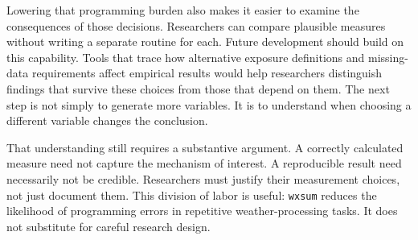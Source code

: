 Lowering that programming burden also makes it easier to examine the consequences of those decisions. Researchers can compare plausible measures without writing a separate routine for each. Future development should build on this capability. Tools that trace how alternative exposure definitions and missing-data requirements affect empirical results would help researchers distinguish findings that survive these choices from those that depend on them. The next step is not simply to generate more variables. It is to understand when choosing a different variable changes the conclusion.

That understanding still requires a substantive argument. A correctly calculated measure need not capture the mechanism of interest. A reproducible result need necessarily not be credible. Researchers must justify their measurement choices, not just document them. This division of labor is useful: \texttt{wxsum} reduces the likelihood of programming errors in repetitive weather-processing tasks. It does not substitute for careful research design.

\endinput
